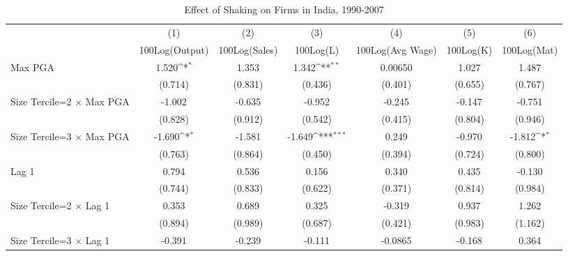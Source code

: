 \begin{table}[htbp]\centering
\def\sym#1{\ifmmode^{#1}\else\(^{#1}\)\fi}
\caption{Effect of Shaking on Firms in India, 1990-2007}
\begin{tabular}{l*{6}{c}}
\toprule
                &\multicolumn{1}{c}{(1)}&\multicolumn{1}{c}{(2)}&\multicolumn{1}{c}{(3)}&\multicolumn{1}{c}{(4)}&\multicolumn{1}{c}{(5)}&\multicolumn{1}{c}{(6)}\\
                &\multicolumn{1}{c}{100Log(Output)}&\multicolumn{1}{c}{100Log(Sales)}&\multicolumn{1}{c}{100Log(L)}&\multicolumn{1}{c}{100Log(Avg Wage)}&\multicolumn{1}{c}{100Log(K)}&\multicolumn{1}{c}{100Log(Mat)}\\
\midrule
Max PGA         &    1.520\sym{*}  &    1.353         &    1.342\sym{**} &  0.00650         &    1.027         &    1.487         \\
                &  (0.714)         &  (0.831)         &  (0.436)         &  (0.401)         &  (0.655)         &  (0.767)         \\
\addlinespace
Size Tercile=2 $\times$ Max PGA&   -1.002         &   -0.635         &   -0.952         &   -0.245         &   -0.147         &   -0.751         \\
                &  (0.828)         &  (0.912)         &  (0.542)         &  (0.415)         &  (0.804)         &  (0.946)         \\
\addlinespace
Size Tercile=3 $\times$ Max PGA&   -1.690\sym{*}  &   -1.581         &   -1.649\sym{***}&    0.249         &   -0.970         &   -1.812\sym{*}  \\
                &  (0.763)         &  (0.864)         &  (0.450)         &  (0.394)         &  (0.724)         &  (0.800)         \\
\addlinespace
Lag 1           &    0.794         &    0.536         &    0.156         &    0.340         &    0.435         &   -0.130         \\
                &  (0.744)         &  (0.833)         &  (0.622)         &  (0.371)         &  (0.814)         &  (0.984)         \\
\addlinespace
Size Tercile=2 $\times$ Lag 1&    0.353         &    0.689         &    0.325         &   -0.319         &    0.937         &    1.262         \\
                &  (0.894)         &  (0.989)         &  (0.687)         &  (0.421)         &  (0.983)         &  (1.162)         \\
\addlinespace
Size Tercile=3 $\times$ Lag 1&   -0.391         &   -0.239         &   -0.111         &  -0.0865         &   -0.168         &    0.364         \\

\end{tabular}
\end{table}
